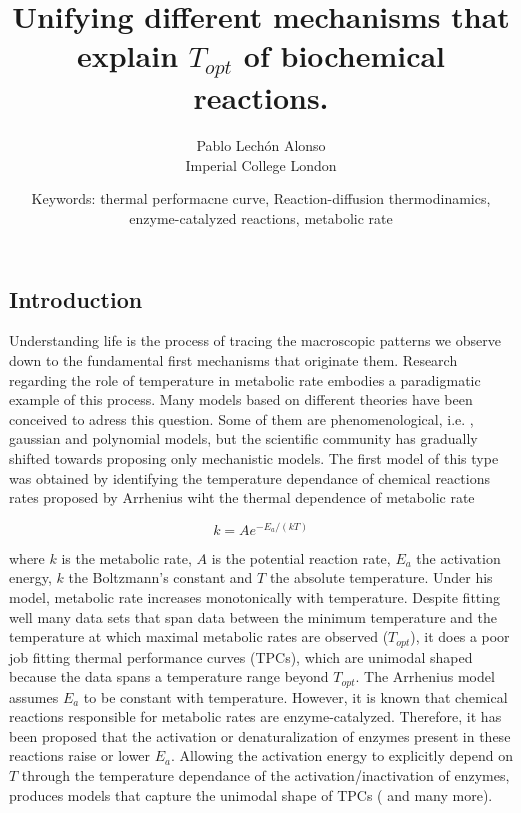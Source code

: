 \documentclass[titlepage,11pt]{article}
\begin{document}
	
	\title{\textbf{Unifying different mechanisms that explain $ T_{opt} $ of biochemical reactions. }}
	\author{Pablo Lechón Alonso \\ [30pt]
		Imperial College London}
	\date{Keywords: thermal performacne curve, Reaction-diffusion thermodinamics, enzyme-catalyzed reactions, metabolic rate}
	\maketitle
	\begin{linenumbers}
		\section{Introduction}
			Understanding life is the process of tracing the macroscopic patterns we observe down to the fundamental first mechanisms that originate them. Research regarding the role of temperature in metabolic rate embodies a paradigmatic example of this process. Many models based on different theories have been conceived to adress this question. Some of them are phenomenological, i.e. \cite{Ratkowsky1982, Lactin1995}, gaussian and polynomial models, but the scientific community has gradually shifted towards proposing only mechanistic models. The first model of this type was obtained by identifying the temperature dependance of chemical reactions rates proposed by Arrhenius \cite{Arrhenius1889} wiht the thermal dependence of metabolic rate
			\begin{linenomath}
				\begin{equation}
				k = A e^{-E_a/(kT)}
				\end{equation}
			\end{linenomath}
			where $ k $ is the metabolic rate, $ A $ is the potential reaction rate, $ E_a $ the activation energy, $ k $ the Boltzmann's constant and $ T $ the absolute temperature. Under his model, metabolic rate increases monotonically with temperature. Despite fitting well many data sets that span data between the minimum temperature and the temperature at which maximal metabolic rates are observed ($ T_{opt} $), it does a poor job fitting thermal performance curves (TPCs), which are unimodal shaped because the data spans a temperature range beyond $ T_{opt} $. The Arrhenius model assumes $ E_a $ to be constant with temperature. However, it is known that chemical reactions responsible for metabolic rates are enzyme-catalyzed. Therefore, it has been proposed that the activation or denaturalization of enzymes present in these reactions raise or lower $ E_a $. Allowing the activation energy to explicitly depend on $ T $ through the temperature dependance of the activation/inactivation of enzymes, produces models that capture the unimodal shape of TPCs (\cite{Johnson1946, Schoolfield1981, Ratkowsky2005} and many more).\\

\end{linenumbers}
\end{document}
